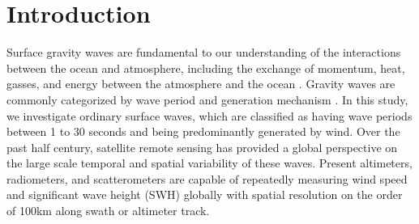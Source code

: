 \documentclass[draft,linenumbers]{agujournal2018}
\begin{document}
%
%


\section{Introduction}

Surface gravity waves are fundamental to our understanding of the interactions between the ocean and atmosphere, including the exchange of momentum, heat, gasses, and energy between the atmosphere and the ocean \cite{cavaleri2012wind}. Gravity waves are commonly categorized by wave period and generation mechanism \cite{munk1951origin}. In this study, we investigate ordinary surface waves, which are classified as having wave periods between 1 to 30 seconds and being predominantly generated by wind. Over the past half century, satellite remote sensing has provided a global perspective on the large scale temporal and spatial variability of these waves. Present altimeters, radiometers, and scatterometers are capable of repeatedly measuring wind speed and significant wave height (SWH) globally with spatial resolution on the order of 100km along swath or altimeter track.


\end{document}
